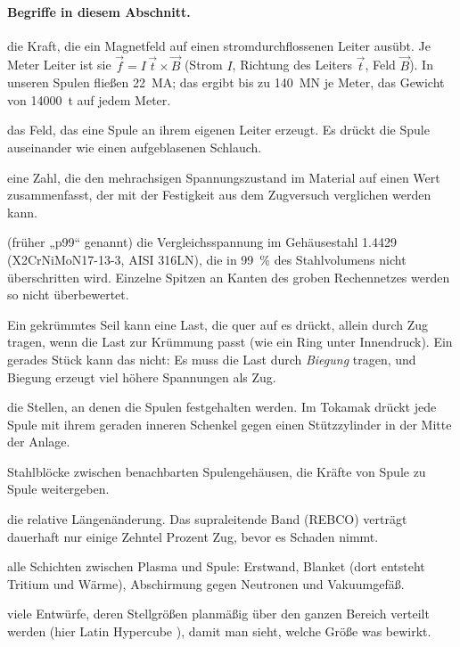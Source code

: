 \paragraph{Begriffe in diesem Abschnitt.}
\begin{description}\itemsep2pt
\item[Lorentzkraft] die Kraft, die ein Magnetfeld auf einen stromdurchflossenen Leiter ausübt. Je Meter Leiter ist
  sie $\vec f = I\,\vec t\times\vec B$ (Strom $I$, Richtung des Leiters $\vec t$, Feld $\vec B$). In unseren Spulen
  fließen \SI{22}{MA}; das ergibt bis zu \SI{140}{MN} je Meter, das Gewicht von \SI{14000}{t} auf jedem Meter.
\item[Eigenfeld] das Feld, das eine Spule an ihrem eigenen Leiter erzeugt. Es drückt die Spule auseinander wie einen
  aufgeblasenen Schlauch.
\item[Vergleichsspannung (von Mises)] eine Zahl, die den mehrachsigen Spannungszustand im Material auf einen Wert
  zusammenfasst, der mit der Festigkeit aus dem Zugversuch verglichen werden kann.
\item[99-\%-Spannung $\sigma_{99}$] (früher „p99“ genannt) die Vergleichsspannung im Gehäusestahl 1.4429 (X2CrNiMoN17-13-3, AISI 316LN), die in 99~\% des Stahlvolumens nicht überschritten wird. Einzelne Spitzen an
  Kanten des groben Rechennetzes werden so nicht überbewertet.
\item[Seilkraft] Ein gekrümmtes Seil kann eine Last, die quer auf es drückt, allein durch Zug tragen, wenn die Last
  zur Krümmung passt (wie ein Ring unter Innendruck). Ein gerades Stück kann das nicht: Es muss die Last durch
  \emph{Biegung} tragen, und Biegung erzeugt viel höhere Spannungen als Zug.
\item[Lager, Stützzylinder] die Stellen, an denen die Spulen festgehalten werden. Im Tokamak drückt jede Spule mit
  ihrem geraden inneren Schenkel gegen einen Stützzylinder in der Mitte der Anlage.
\item[Verbinder] Stahlblöcke zwischen benachbarten Spulengehäusen, die Kräfte von Spule zu Spule weitergeben.
\item[Dehnung] die relative Längenänderung. Das supraleitende Band (REBCO) verträgt dauerhaft nur einige Zehntel
  Prozent Zug, bevor es Schaden nimmt.
\item[Package] alle Schichten zwischen Plasma und Spule: Erstwand, Blanket (dort entsteht Tritium und Wärme),
  Abschirmung gegen Neutronen und Vakuumgefäß.
\item[Entwurfsstudie (DOE)] viele Entwürfe, deren Stellgrößen planmäßig über den ganzen Bereich verteilt werden
  (hier Latin Hypercube \cite{mckay1979}), damit man sieht, welche Größe was bewirkt.
\end{description}

